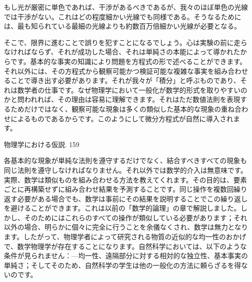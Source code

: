 \documentclass[a4paper,11pt,openany]{ltjsbook}
\begin{document}
もし光が厳密に単色であれば、干渉があるべきであるが、我々のほぼ単色の光線では干渉がない。これはどの程度細かい光線でも同様である。そうなるためには、最も知られている最細の光線よりも約数百万倍細かい光線が必要となる。

そこで、限界に進むことで誤りを犯すことになるでしょう。心は実験の前に走らなければならず、それが成功した場合、それは単純さの本能によって導かれたからです。基本的な事実の知識により問題を方程式の形で述べることができます。それ以外には、その方程式から観察可能かつ検証可能な複雑な事実を組み合わせることで導き出す必要があります。それが我々が「積分」と呼ぶものであり、それは数学者の仕事です。なぜ物理学において一般化が数学的形式を取りやすいのかと問われれば、その理由は容易に理解できます。それはただ数値法則を表現するためだけではなく、観察可能な現象は多くの類似した基本的な現象の重ね合わせによるものであるからです。このようにして微分方程式が自然に導入されます。

物理学における仮説. 159

各基本的な現象が単純な法則を遵守するだけでなく、結合すべきすべての現象も同じ法則を遵守しなければなりません。それ以外では数学的介入は無意味です。実際、数学は類似ものを組み合わせる方法を教えてくれます。その目的は、要素ごとに再構築せずに組み合わせ結果を予測することです。同じ操作を複数回繰り返す必要がある場合でも、数学は事前にその結果を説明することでこの繰り返しを避けることができます。これは以前の「数学的論理」の章で解説しました。しかし、そのためにはこれらのすべての操作が類似している必要があります；それ以外の場合、明らかに個々に完全に行うことを余儀なくされ、数学は無力となります。したがって、物理学者によって研究される物質の近似的な均一性のおかげで、数学物理学が存在することになります。自然科学においては、以下のような条件が見られません：—均一性、遠隔部分に対する相対的な独立性、基本事実の単純さ；そしてそのため、自然科学の学生は他の一般化の方法に頼らざるを得ないのです。
\end{document}

